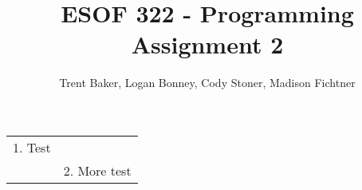 \documentclass[10pt,letterpaper]{article}
\author{Trent Baker, Logan Bonney, Cody Stoner, Madison Fichtner}
\title{ESOF 322 - Programming Assignment 2}
\newcommand{\usecasetwocol}[1]{
\begin{center}
	\begin{tabularx}{0.8\textwidth}{| X X |}
		\hline
		#1 \\
		\hline
	\end{tabularx}
\end{center}
}
\begin{document}
\maketitle
\usecasetwocol{
	1. Test & \\
	& 2. More test
}
\end{document}
